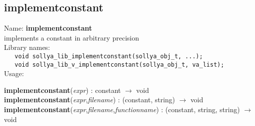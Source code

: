 \subsection{implementconstant}
\label{labimplementconstant}
\noindent Name: \textbf{implementconstant}\\
\phantom{aaa}implements a constant in arbitrary precision\\[0.2cm]
\noindent Library names:\\
\verb|   void sollya_lib_implementconstant(sollya_obj_t, ...);|\\
\verb|   void sollya_lib_v_implementconstant(sollya_obj_t, va_list);|\\[0.2cm]
\noindent Usage: 
\begin{center}
\textbf{implementconstant}(\emph{expr}) : \textsf{constant} $\rightarrow$ \textsf{void}\\
\textbf{implementconstant}(\emph{expr},\emph{filename}) : (\textsf{constant}, \textsf{string}) $\rightarrow$ \textsf{void}\\
\textbf{implementconstant}(\emph{expr},\emph{filename},\emph{functionname}) : (\textsf{constant}, \textsf{string}, \textsf{string}) $\rightarrow$ \textsf{void}\\
\end{center}
